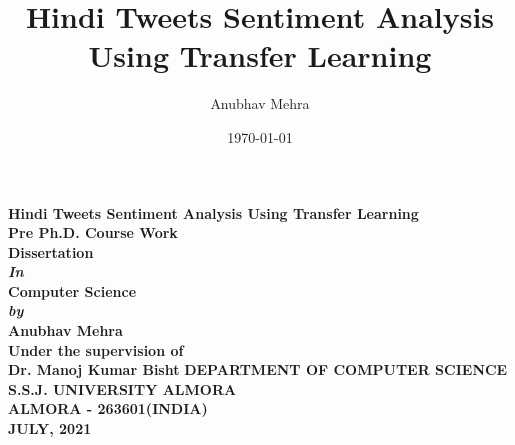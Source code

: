 \documentclass[a4paper, 12pt]{article}
\title{Hindi Tweets Sentiment Analysis Using Transfer Learning}
\author{Anubhav Mehra}
\date{\today}
\begin{document}
\begin{titlepage}
	\begin{center}
		\vspace*{1cm}
			\Large{\textbf{Hindi Tweets Sentiment Analysis Using Transfer Learning}}\\
			\vspace*{3cm}
			\large{\textbf{Pre Ph.D. Course Work \\ Dissertation}}\\ [1cm]
			\large{\textbf{\textit{In}}}\\[1cm]
			\large{\textbf{Computer Science}}\\ [1cm]
			\large{\textit{\textbf{by}}} \\[1cm]
			\large{\textbf{Anubhav Mehra}}\\
			\vspace*{1cm}
			\large{\textbf{Under the supervision of}}\\
			\large{\textbf{Dr. Manoj Kumar Bisht}}
			\vfill
			\Large{\textbf{DEPARTMENT OF COMPUTER SCIENCE \\ S.S.J. UNIVERSITY ALMORA \\ ALMORA - 263601(INDIA) \\ JULY, 2021}}
			
			\normalsize
			
	\end{center}
\end{titlepage}
\end{document}
